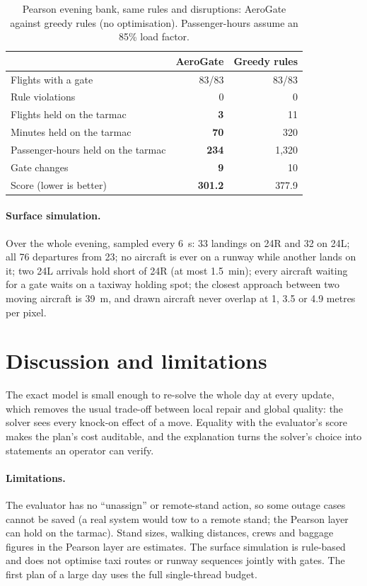 \documentclass[11pt]{article}
\theoremstyle{remark}
\begin{document}
\begin{table}[htbp]
\centering
\caption{Pearson evening bank, same rules and disruptions: AeroGate against greedy rules (no
optimisation). Passenger-hours assume an 85\% load factor.}
\label{tab:vs}
\begin{tabular}{lrr}
\toprule
 & AeroGate & Greedy rules\\
\midrule
Flights with a gate & 83/83 & 83/83\\
Rule violations & 0 & 0\\
Flights held on the tarmac & \textbf{3} & 11\\
Minutes held on the tarmac & \textbf{70} & 320\\
Passenger-hours held on the tarmac & \textbf{234} & 1{,}320\\
Gate changes & \textbf{9} & 10\\
Score (lower is better) & \textbf{301.2} & 377.9\\
\bottomrule
\end{tabular}
\end{table}

\paragraph{Surface simulation.} Over the whole evening, sampled every 6~s: 33 landings on 24R and 32
on 24L; all 76 departures from 23; no aircraft is ever on a runway while another lands on it; two 24L
arrivals hold short of 24R (at most 1.5~min); every aircraft waiting for a gate waits on a taxiway
holding spot; the closest approach between two moving aircraft is 39~m, and drawn aircraft never
overlap at 1, 3.5 or 4.9 metres per pixel.

\section{Discussion and limitations}
The exact model is small enough to re-solve the whole day at every update, which removes the usual
trade-off between local repair and global quality: the solver sees every knock-on effect of a move.
Equality with the evaluator's score makes the plan's cost auditable, and the explanation turns the
solver's choice into statements an operator can verify.

\paragraph{Limitations.} The evaluator has no ``unassign'' or remote-stand action, so some outage cases
cannot be saved (a real system would tow to a remote stand; the Pearson layer can hold on the tarmac).
Stand sizes, walking distances, crews and baggage figures in the Pearson layer are estimates. The
surface simulation is rule-based and does not optimise taxi routes or runway sequences jointly with
gates. The first plan of a large day uses the full single-thread budget.
\end{document}
